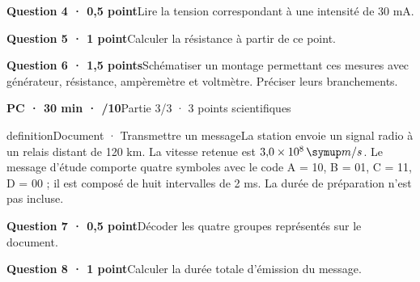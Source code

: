 \par\addvspace{3mm}\noindent\begin{minipage}{\linewidth}\textbf{Question 4 · 0,5 point}\quad Lire la tension correspondant à une intensité de 30 mA.\par\end{minipage}\par
\par\addvspace{3mm}\noindent\begin{minipage}{\linewidth}\textbf{Question 5 · 1 point}\quad Calculer la résistance à partir de ce point.\par\end{minipage}\par
\par\addvspace{3mm}\noindent\begin{minipage}{\linewidth}\textbf{Question 6 · 1,5 points}\quad Schématiser un montage permettant ces mesures avec générateur, résistance, ampèremètre et voltmètre. Préciser leurs branchements.\par\end{minipage}\par
\vfill{}
\textbf{PC · 30 min · /10}\hfill Partie 3/3 · 3 points scientifiques
\begin{pcEncadre}{definition}{Document · Transmettre un message}La station envoie un signal radio à un relais distant de 120 km. La vitesse retenue est $3{,}0\times10^8\unite{m/s}$. Le message d’étude comporte quatre symboles avec le code A = 10, B = 01, C = 11, D = 00 ; il est composé de huit intervalles de 2 ms. La durée de préparation n’est pas incluse.\end{pcEncadre}
\par\addvspace{3mm}\noindent\begin{minipage}{\linewidth}\textbf{Question 7 · 0,5 point}\quad Décoder les quatre groupes représentés sur le document.\par\end{minipage}\par
\par\addvspace{3mm}\noindent\begin{minipage}{\linewidth}\textbf{Question 8 · 1 point}\quad Calculer la durée totale d’émission du message.\par\end{minipage}\par
